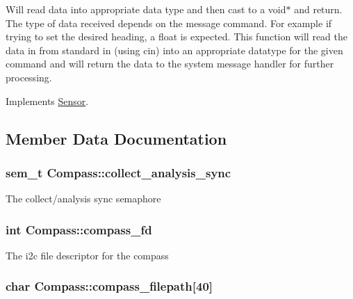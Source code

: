 Will read data into appropriate data type and then cast to a void$\ast$ and return. The type of data received depends on the message command. For example if trying to set the desired heading, a float is expected. This function will read the data in from standard in (using cin) into an appropriate datatype for the given command and will return the data to the system message handler for further processing. 

Implements \hyperlink{classSensor_acf4ff5c6c8f793ed47a8105b94ff7c3e}{Sensor}.



\subsection{Member Data Documentation}
\hypertarget{classCompass_ace6e13b91461366609f093fef09188d9}{
\subsubsection[{collect\-\_\-analysis\-\_\-sync}]{\setlength{\rightskip}{0pt plus 5cm}sem\-\_\-t Compass\-::collect\-\_\-analysis\-\_\-sync\hspace{0.3cm}{\ttfamily [protected]}}}\label{classCompass_ace6e13b91461366609f093fef09188d9}
The collect/analysis sync semaphore \hypertarget{classCompass_a44b0e4223918e3b139e54d54a0e3daad}{
\subsubsection[{compass\-\_\-fd}]{\setlength{\rightskip}{0pt plus 5cm}int Compass\-::compass\-\_\-fd\hspace{0.3cm}{\ttfamily [protected]}}}\label{classCompass_a44b0e4223918e3b139e54d54a0e3daad}
The i2c file descriptor for the compass \hypertarget{classCompass_a6ff33d93efe79539c75dbee45efdc97c}{
\subsubsection[{compass\-\_\-filepath}]{\setlength{\rightskip}{0pt plus 5cm}char Compass\-::compass\-\_\-filepath\mbox{[}40\mbox{]}\hspace{0.3cm}{\ttfamily [protected]}}}\label{classCompass_a6ff33d93efe79539c75dbee45efdc97c}

